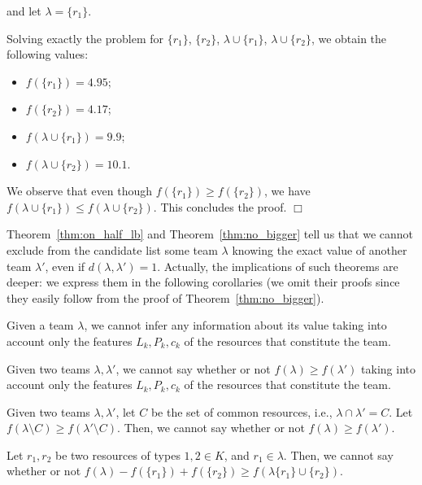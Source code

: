 \noindent
and let $\lambda = \{r_1\}$.

\noindent
Solving exactly the problem for $\{r_1\}$, $\{r_2\}$, $\lambda \cup \{r_1\}$, $\lambda \cup \{r_2\}$, we obtain the following values:
\begin{itemize}
\item $f(\{r_1\}) = 4.95$;
\item $f(\{r_2\}) = 4.17$;
\item $f(\lambda \cup \{r_1\}) = 9.9$;
\item $f(\lambda \cup \{r_2\}) = 10.1$.
\end{itemize}

\noindent
We observe that even though $f(\{r_1\}) \geq f(\{r_2\})$, we have $f(\lambda \cup \{r_1\}) \leq f(\lambda \cup \{r_2\})$. This concludes the proof.
\hfill $\Box$

Theorem~\ref{thm:on_half_lb} and Theorem~\ref{thm:no_bigger} tell us that we cannot exclude from the candidate list some team $\lambda$ knowing the exact value of another team $\lambda'$, even if $d(\lambda,\lambda') = 1$. Actually, the implications of such theorems are deeper: we express them in the following corollaries (we omit their proofs since they easily follow from the proof of Theorem~\ref{thm:no_bigger}).

\begin{corollary}\label{cor:features_single_team}
Given a team $\lambda$, we cannot infer any information about its value taking into account only the features $L_k, P_k, c_k$ of the resources that constitute the team.
\end{corollary}

\begin{corollary}\label{cor:features_two_teams}
Given two teams $\lambda, \lambda'$, we cannot say whether or not $f(\lambda) \geq f(\lambda')$  taking into account only the features $L_k, P_k, c_k$ of the resources that constitute the team.
\end{corollary}

\begin{corollary}\label{cor:resource_difference}
Given two teams $\lambda, \lambda'$, let $C$ be the set of common resources, i.e., $\lambda \cap \lambda' = C$. Let $f(\lambda \setminus C) \geq f(\lambda' \setminus C)$. Then, we cannot say whether or not $f(\lambda) \geq f(\lambda')$.
\end{corollary}

\begin{corollary}
Let $r_1, r_2$ be two resources of types $1,2 \in K$, and $r_1 \in \lambda$. Then, we cannot say whether or not $f(\lambda) - f(\{r_1\}) + f(\{r_2\}) \geq f(\lambda \{r_1\} \cup \{r_2\})$.
\end{corollary}

